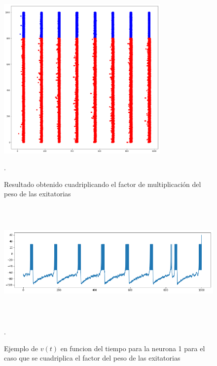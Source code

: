 \documentclass[12pt]{article}
\begin{document}
\begin{figure}[htp!]
    \centering
        \includegraphics[height=8cm]{images/resultadoCuadrupleExitatorias.png}
    \caption[fontsize=2pt]{Resultado obtenido cuadriplicando el factor de multiplicación del peso de las exitatorias}.
\end{figure}

\begin{figure}[htp!]
    \centering
        \includegraphics[height=6cm, width=15cm]{images/ejemploNeuronaCuadrupleExitatoria.png}
    \caption[fontsize=2pt]{Ejemplo de $v(t)$ en funcion del tiempo para la neurona 1 para el caso que se cuadriplica el factor del peso de las exitatorias}.
\end{figure}

\newpage
\end{document}
